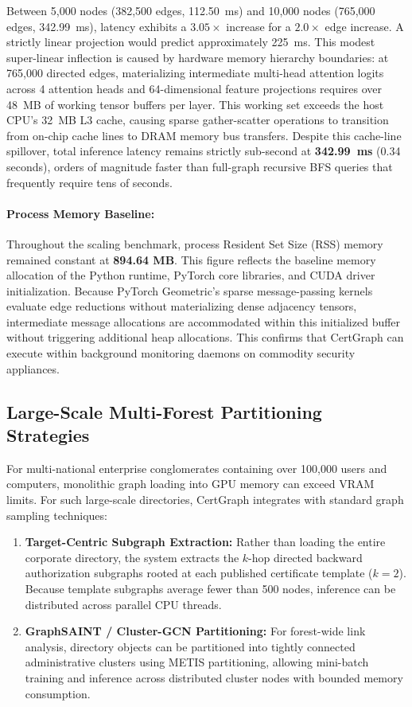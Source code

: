 Between 5,000 nodes (382,500 edges, 112.50~ms) and 10,000 nodes (765,000 edges, 342.99~ms), latency exhibits a $3.05\times$ increase for a $2.0\times$ edge increase. A strictly linear projection would predict approximately 225~ms. This modest super-linear inflection is caused by hardware memory hierarchy boundaries: at 765,000 directed edges, materializing intermediate multi-head attention logits across 4 attention heads and 64-dimensional feature projections requires over 48~MB of working tensor buffers per layer. This working set exceeds the host CPU's 32~MB L3 cache, causing sparse gather-scatter operations to transition from on-chip cache lines to DRAM memory bus transfers. Despite this cache-line spillover, total inference latency remains strictly sub-second at \textbf{342.99~ms} (0.34 seconds), orders of magnitude faster than full-graph recursive BFS queries that frequently require tens of seconds.

\paragraph{Process Memory Baseline:}
Throughout the scaling benchmark, process Resident Set Size (RSS) memory remained constant at \textbf{894.64 MB}. This figure reflects the baseline memory allocation of the Python runtime, PyTorch core libraries, and CUDA driver initialization. Because PyTorch Geometric's sparse message-passing kernels evaluate edge reductions without materializing dense adjacency tensors, intermediate message allocations are accommodated within this initialized buffer without triggering additional heap allocations. This confirms that CertGraph can execute within background monitoring daemons on commodity security appliances.

\subsection{Large-Scale Multi-Forest Partitioning Strategies}
For multi-national enterprise conglomerates containing over 100,000 users and computers, monolithic graph loading into GPU memory can exceed VRAM limits. For such large-scale directories, CertGraph integrates with standard graph sampling techniques:
\begin{enumerate}
    \item \textbf{Target-Centric Subgraph Extraction:} Rather than loading the entire corporate directory, the system extracts the $k$-hop directed backward authorization subgraphs rooted at each published certificate template ($k=2$). Because template subgraphs average fewer than 500 nodes, inference can be distributed across parallel CPU threads.
    \item \textbf{GraphSAINT / Cluster-GCN Partitioning:} For forest-wide link analysis, directory objects can be partitioned into tightly connected administrative clusters using METIS partitioning, allowing mini-batch training and inference across distributed cluster nodes with bounded memory consumption.
\end{enumerate}
